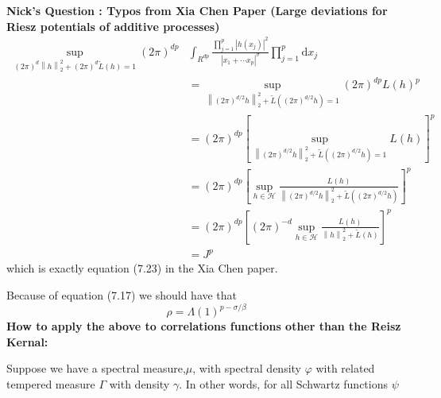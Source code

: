 \documentclass[a4paper,11pt]{article}
\numberwithin{equation}{section}
\theoremstyle{plain}
\theoremstyle{definition}
\newcommand{\ud}{\ensuremath{\mathrm{d} }}
\newcommand{\Norm}[1]{\left\|  #1   \right\|}
\newcounter{NQ}
\newenvironment{NickQuestion}[1][] %
{\refstepcounter{NQ}
	\begin{mdframed}[backgroundcolor=lightgray]\textbf{Nick's Question \theNQ \: #1~~}~~~\noindent}%
	{\end{mdframed}}
\numberwithin{NQ}{section}
\numberwithin{LQ}{section}
\numberwithin{ZQ}{section}
\begin{document}
\begin{NickQuestion}[ : Typos from Xia Chen Paper (Large deviations for Riesz potentials of additive processes) ]
		\begin{align*}
		\sup_{(2\pi)^d \Norm{h}_2^2 + (2\pi)^d \tilde{L}(h) =1} (2\pi)^{dp} & \int_{R^{dp}} \frac{\prod_{j = 1}^p |h(x_j)|^2}{|x_1+ \cdots x_p|^{\sigma}} \prod_{j = 1}^p \ud x_j
		\\ &= 	 \sup_{\Norm{(2\pi)^{d/2} h}_2^2 +  \tilde{L}((2\pi)^{d/2} h) =1} 	(2\pi)^{dp} L(h)^p
		\\& =(2\pi)^{dp}  \left[ \sup_{\Norm{(2\pi)^{d/2} h}_2^2 +  \tilde{L}((2\pi)^{d/2} h) =1} 	L(h) \right]^p
		\\& = (2\pi)^{dp}  \left[ \sup_{h \in \mathcal{H}} 	\frac{L(h)}{\Norm{(2\pi)^{d/2} h}_2^2 +  \tilde{L}((2\pi)^{d/2} h)} \right]^p
		\\& = (2\pi)^{dp}  \left[ (2\pi)^{-d} \sup_{h \in \mathcal{H}} 	\frac{L(h)}{\Norm{ h}_2^2 +  \tilde{L}( h)} \right]^p
		\\& = J^p
		\end{align*}
		which is exactly equation (7.23) in the Xia Chen paper.

		Because of equation (7.17) we should have that
		\begin{equation}\label{rhofix}
		\rho = \Lambda(1)^{p-\sigma/\beta}
		\end{equation}
		\textbf{How to apply the above to correlations functions other than the Reisz Kernal:}

		Suppose we have a spectral measure,$\mu$, with spectral density $\varphi$ with related tempered measure $\Gamma$ with density $\gamma$. In other words, for all Schwartz functions $\psi$


\end{NickQuestion}
\end{document}
